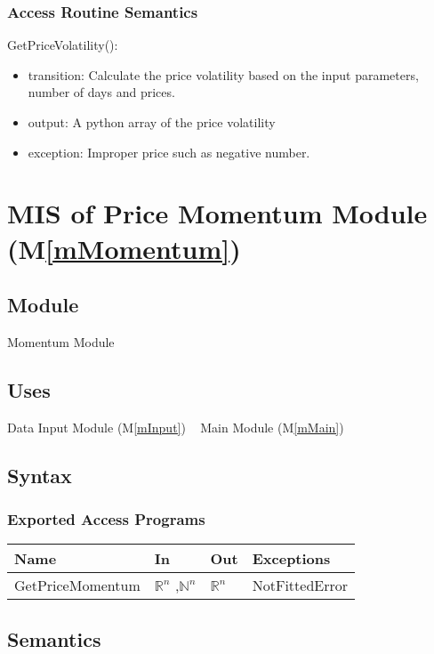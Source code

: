 \documentclass[12pt, titlepage]{article}
\newcommand{\mref}[1]{M\ref{#1}}
\begin{document}
\subsubsection{Access Routine Semantics}

\noindent GetPriceVolatility():
\begin{itemize}
\item transition: Calculate the price volatility based on the input parameters, number of days and prices.
\item output: A python array of the price volatility
\item exception: Improper price such as negative number.
\end{itemize}


\section{MIS of Price Momentum Module (\mref{mMomentum}) } 

\subsection{Module}
Momentum Module
\subsection{Uses}
Data Input Module (\mref{mInput})
~\newline
Main Module (\mref{mMain})
\subsection{Syntax}

\subsubsection{Exported Access Programs}

\begin{center}
\begin{tabular}{p{4cm} p{2cm} p{2cm} p{4cm}}
\hline
\textbf{Name} & \textbf{In} & \textbf{Out} & \textbf{Exceptions} \\
\hline

GetPriceMomentum & $\mathbb{R}^n$ ,$\mathbb{N}^n$ & $\mathbb{R}^n$ & NotFittedError \\
\hline
\end{tabular}
\end{center}

\subsection{Semantics}
\end{document}
